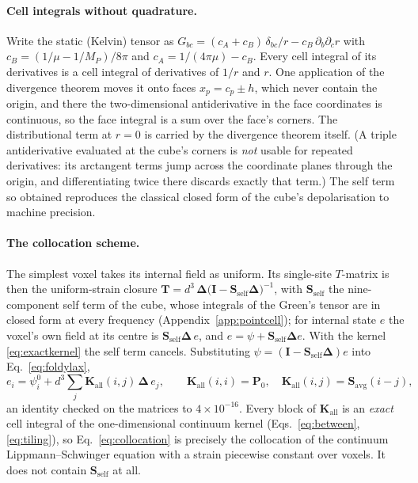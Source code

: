 \documentclass[11pt,a4paper]{article}
\newcommand{\bK}{\mathbf{K}}
\newcommand{\bD}{\boldsymbol{\Delta}}
\newcommand{\bI}{\mathbf{I}}
\newcommand{\bS}{\mathbf{S}}
\newcommand{\bT}{\mathbf{T}}
\newcommand{\bP}{\mathbf{P}}
\begin{document}
\paragraph{Cell integrals without quadrature.} Write the static (Kelvin) tensor as
$G_{bc}=(c_A+c_B)\,\delta_{bc}/r-c_B\,\partial_b\partial_c r$ with
$c_B=(1/\mu-1/M_P)/8\pi$ and $c_A=1/(4\pi\mu)-c_B$. Every cell integral of its derivatives is a cell
integral of derivatives of $1/r$ and $r$. One application of the divergence theorem moves it onto
faces $x_p=c_p\pm h$, which never contain the origin, and there the two-dimensional antiderivative in
the face coordinates is continuous, so the face integral is a sum over the face's corners. The
distributional term at $r=0$ is carried by the divergence theorem itself. (A triple antiderivative
evaluated at the cube's corners is \emph{not} usable for repeated derivatives: its arctangent terms
jump across the coordinate planes through the origin, and differentiating twice there discards
exactly that term.) The self term so obtained reproduces the classical closed form of the cube's
depolarisation \citep{Chiu1977,Nozaki2001} to machine precision.


\paragraph{The collocation scheme.} The simplest voxel takes its internal field as uniform. Its
single-site $T$-matrix is then the uniform-strain closure $\bT=d^3\,\bD\bigl(\bI-\bS_{\text{self}}\bD\bigr)^{-1}$,
with $\bS_{\text{self}}$ the nine-component self term of the cube, whose integrals of the Green's tensor are
in closed form at every frequency (Appendix~\ref{app:pointcell}); for internal state $e$ the voxel's own field at its centre is
$\bS_{\text{self}}\bD\,e$, and $e=\psi+\bS_{\text{self}}\bD e$.
With the kernel \eqref{eq:exactkernel} the self term cancels. Substituting
$\psi=(\bI-\bS_{\text{self}}\bD)e$ into Eq.~\eqref{eq:foldylax},
\begin{equation}\label{eq:collocation}
  e_i=\psi^0_i+d^3\sum_j \bK_{\text{all}}(i,j)\,\bD\,e_j,
  \qquad
  \bK_{\text{all}}(i,i)=\bP_0,\quad \bK_{\text{all}}(i,j)=\bS_{\text{avg}}(i-j),
\end{equation}
an identity checked on the matrices to $4\times10^{-16}$. Every block of $\bK_{\text{all}}$ is an
\emph{exact} cell integral of the one-dimensional continuum kernel (Eqs.~\eqref{eq:between},
\eqref{eq:tiling}), so Eq.~\eqref{eq:collocation} is precisely the collocation of the continuum
Lippmann--Schwinger equation with a strain piecewise constant over voxels. It does not contain
$\bS_{\text{self}}$ at all.
\end{document}
